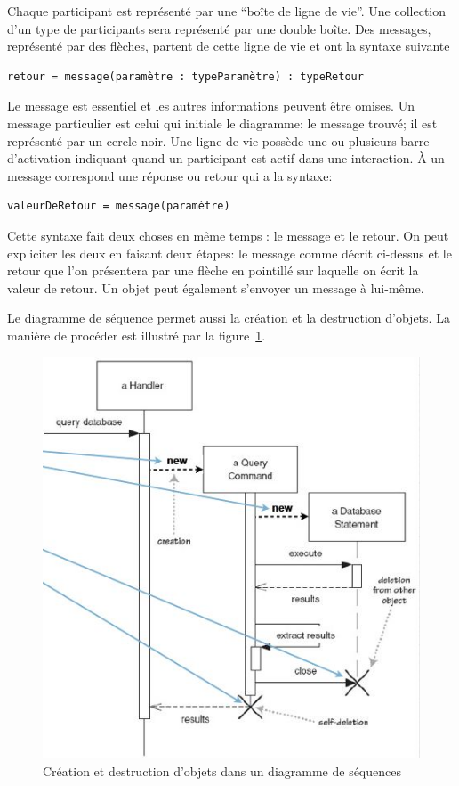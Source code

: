 Chaque participant est représenté par une ``boîte de ligne de vie''.
Une collection d'un type de participants sera représenté par une double boîte.
Des messages, représenté par des flèches,
partent de cette ligne de vie et ont la syntaxe suivante
\begin{verbatim}
retour = message(paramètre : typeParamètre) : typeRetour
\end{verbatim}
Le message est essentiel et les autres informations peuvent être omises.
Un message particulier est celui qui initiale le diagramme:
le message trouvé; il est représenté par un cercle noir.
Une ligne de vie possède une ou plusieurs barre d'activation
indiquant quand un participant est actif dans une interaction.
À un message correspond une réponse ou retour qui a la syntaxe:
\begin{verbatim}
valeurDeRetour = message(paramètre)
\end{verbatim}
Cette syntaxe fait deux choses en même temps : le message et le retour.
On peut expliciter les deux en faisant deux étapes:
le message comme décrit ci-dessus et le retour que l'on présentera
par une flèche en pointillé sur laquelle on écrit la valeur de retour.
Un objet peut également s'envoyer un message à lui-même.

Le diagramme de séquence permet aussi la création et la destruction d'objets.
La manière de procéder est illustré
par la figure~\ref{diagramme_sequences_objet}.
\begin{figure}[h]
  \centering
  \includegraphics[scale=0.75]{diagramme_sequences_objet.jpg}
  \caption{Création et destruction d'objets dans un diagramme de séquences}
  \label{diagramme_sequences_objet}
\end{figure}

